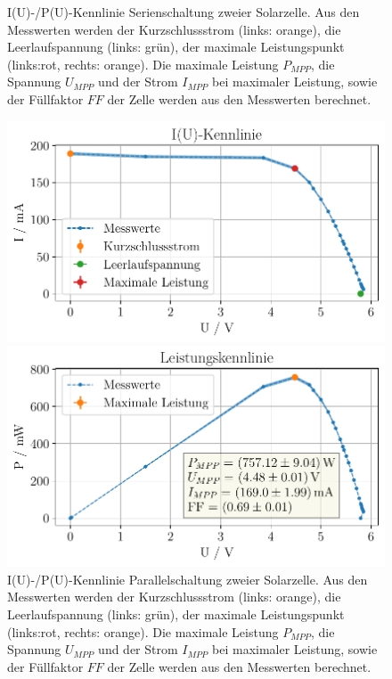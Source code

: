 \documentclass[english, ngerman]{scrartcl}
\begin{document}
\begin{figure}[H]
\begin{minipage}[t]{0.485\linewidth}
    \end{minipage}
    \caption[I(U)-/P(U)-Kennlinie Serienschaltung Solarzelle]{I(U)-/P(U)-Kennlinie Serienschaltung zweier Solarzelle. Aus den Messwerten werden der Kurzschlussstrom (links: orange), die Leerlaufspannung (links: grün), der maximale Leistungspunkt (links:rot, rechts: orange). Die maximale Leistung $P_{MPP}$, die Spannung $U_{MPP}$ und der Strom $I_{MPP}$ bei maximaler Leistung, sowie der Füllfaktor $FF$ der Zelle werden aus den Messwerten berechnet.}
    \label{fig:solar_seriell}
\end{figure}
\setcaphanging

\setcapindent{0pt}
\begin{figure}[H]
    \centering
    \begin{minipage}[t]{0.485\linewidth}
        \centering
        \includegraphics[width=\linewidth]{fig/plots/solar_parallel_UI_.pdf}
    \end{minipage}%
    \hspace*{\fill}
    \begin{minipage}[t]{0.485\linewidth}
        \centering
        \includegraphics[width=\linewidth]{fig/plots/solar_parallel_UP_.pdf}
    \end{minipage}
    \caption[I(U)-/P(U)-Kennlinie Parallelschaltung Solarzelle]{I(U)-/P(U)-Kennlinie Parallelschaltung zweier Solarzelle. Aus den Messwerten werden der Kurzschlussstrom (links: orange), die Leerlaufspannung (links: grün), der maximale Leistungspunkt (links:rot, rechts: orange). Die maximale Leistung $P_{MPP}$, die Spannung $U_{MPP}$ und der Strom $I_{MPP}$ bei maximaler Leistung, sowie der Füllfaktor $FF$ der Zelle werden aus den Messwerten berechnet.}
    \label{fig:solar_parallel}
\end{figure}
\end{document}
